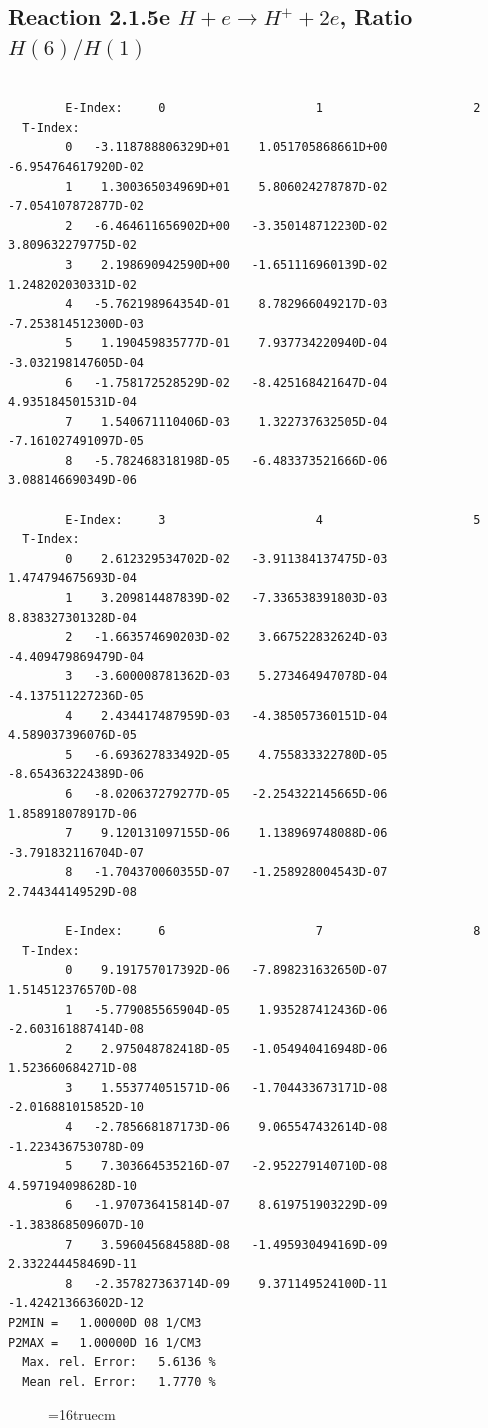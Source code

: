 \documentclass[12pt,dvipdfmx]{article}
\begin{document}
\newpage
\subsection{
Reaction 2.1.5e  $H + e \rightarrow H^+ + 2e$, Ratio $H(6)/H(1)$
}


\begin{small}\begin{verbatim}

        E-Index:     0                     1                     2
  T-Index:
        0   -3.118788806329D+01    1.051705868661D+00   -6.954764617920D-02
        1    1.300365034969D+01    5.806024278787D-02   -7.054107872877D-02
        2   -6.464611656902D+00   -3.350148712230D-02    3.809632279775D-02
        3    2.198690942590D+00   -1.651116960139D-02    1.248202030331D-02
        4   -5.762198964354D-01    8.782966049217D-03   -7.253814512300D-03
        5    1.190459835777D-01    7.937734220940D-04   -3.032198147605D-04
        6   -1.758172528529D-02   -8.425168421647D-04    4.935184501531D-04
        7    1.540671110406D-03    1.322737632505D-04   -7.161027491097D-05
        8   -5.782468318198D-05   -6.483373521666D-06    3.088146690349D-06

        E-Index:     3                     4                     5
  T-Index:
        0    2.612329534702D-02   -3.911384137475D-03    1.474794675693D-04
        1    3.209814487839D-02   -7.336538391803D-03    8.838327301328D-04
        2   -1.663574690203D-02    3.667522832624D-03   -4.409479869479D-04
        3   -3.600008781362D-03    5.273464947078D-04   -4.137511227236D-05
        4    2.434417487959D-03   -4.385057360151D-04    4.589037396076D-05
        5   -6.693627833492D-05    4.755833322780D-05   -8.654363224389D-06
        6   -8.020637279277D-05   -2.254322145665D-06    1.858918078917D-06
        7    9.120131097155D-06    1.138969748088D-06   -3.791832116704D-07
        8   -1.704370060355D-07   -1.258928004543D-07    2.744344149529D-08

        E-Index:     6                     7                     8
  T-Index:
        0    9.191757017392D-06   -7.898231632650D-07    1.514512376570D-08
        1   -5.779085565904D-05    1.935287412436D-06   -2.603161887414D-08
        2    2.975048782418D-05   -1.054940416948D-06    1.523660684271D-08
        3    1.553774051571D-06   -1.704433673171D-08   -2.016881015852D-10
        4   -2.785668187173D-06    9.065547432614D-08   -1.223436753078D-09
        5    7.303664535216D-07   -2.952279140710D-08    4.597194098628D-10
        6   -1.970736415814D-07    8.619751903229D-09   -1.383868509607D-10
        7    3.596045684588D-08   -1.495930494169D-09    2.332244458469D-11
        8   -2.357827363714D-09    9.371149524100D-11   -1.424213663602D-12
P2MIN =   1.00000D 08 1/CM3
P2MAX =   1.00000D 16 1/CM3
  Max. rel. Error:   5.6136 %
  Mean rel. Error:   1.7770 %

\end{verbatim}\end{small}
\begin{figure} \label{2.1.5e}
\epsfxsize=16truecm
\end{figure}
\end{document}
